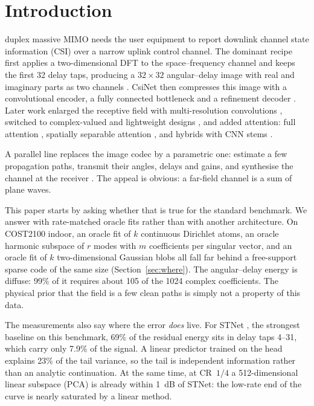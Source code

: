 \documentclass[journal]{IEEEtran}
\begin{document}
\section{Introduction}
 duplex massive MIMO needs the user equipment to
report downlink channel state information (CSI) over a narrow uplink control
channel. The dominant recipe first applies a two-dimensional DFT to the
space--frequency channel and keeps the first 32 delay taps, producing a
$32\times32$ angular--delay image with real and imaginary parts as two channels
\cite{wen2018}. CsiNet then compresses this image with a convolutional encoder, a
fully connected bottleneck and a refinement decoder \cite{wen2018}. Later work
enlarged the receptive field with multi-resolution convolutions \cite{lu2020},
switched to complex-valued and lightweight designs \cite{ji2021,cvl2022}, and added
attention: full attention \cite{cui2022}, spatially separable attention
\cite{mourya2023}, and hybrids with CNN stems \cite{lou2025,ansarifard2025}.

A parallel line replaces the image codec by a parametric one: estimate a few
propagation paths, transmit their angles, delays and gains, and synthesise the
channel at the receiver \cite{guo2022model,liu2022markov,ma2023typeii}. The appeal
is obvious: a far-field channel is a sum of plane waves.

This paper starts by asking whether that is true for the standard benchmark. We answer with rate-matched oracle fits rather than with another architecture.
On COST2100 indoor, an oracle fit of $k$ continuous Dirichlet atoms, an oracle
harmonic subspace of $r$ modes with $m$ coefficients per singular vector, and an
oracle fit of $k$ two-dimensional Gaussian blobs all fall far behind a
free-support sparse code of the same size (Section~\ref{sec:where}). The angular--delay
energy is diffuse: 99\% of it requires about 105 of the 1024 complex coefficients.
The physical prior that the field is a few clean paths is simply not a property of
this data.

The measurements also say where the error \emph{does} live. For STNet
\cite{mourya2023}, the strongest baseline on this benchmark, 69\% of the residual
energy sits in delay taps 4--31, which carry only 7.9\% of the signal. A linear
predictor trained on the head explains 23\% of the tail variance, so the tail is
independent information rather than an analytic continuation. At the same time, at
CR~$1/4$ a 512-dimensional linear subspace (PCA) is already within 1~dB of STNet:
the low-rate end of the curve is nearly saturated by a linear method.
\end{document}
